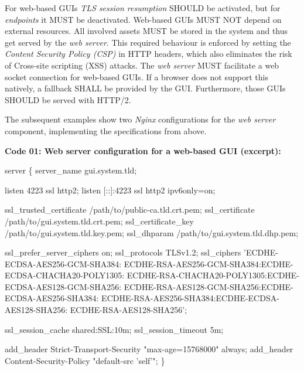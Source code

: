 \documentclass[12pt,english,a4paper,titlepage,cleardoublepage=empty,dottedtoc]{report}
\newenvironment{Shaded}{\begin{snugshade}}{\end{snugshade}}
\newcommand{\NormalTok}[1]{#1}
\begin{document}
For web-based GUIs \emph{TLS session resumption} SHOULD be activated,
but for \emph{endpoints} it MUST be deactivated. Web-based GUIs MUST NOT
depend on external resources. All involved assets MUST be stored in the
system and thus get served by the \emph{web server}. This required
behaviour is enforced by setting the \emph{Content Security Policy
(CSP)} in HTTP headers, which also eliminates the risk of Cross-site
scripting (XSS) attacks. The \emph{web server} MUST facilitate a web
socket connection for web-based GUIs. If a browser does not support this
natively, a fallback SHALL be provided by the GUI. Furthermore, those
GUIs SHOULD be served with HTTP/2.

The subsequent examples show two \emph{Nginx} configurations for the
\emph{web server} component, implementing the specifications from above.

\newpage

\textbf{\protect\hypertarget{spec_code-01_nginx-config-web-gui}{}{Code
01: Web server configuration for a web-based GUI (excerpt)}:}

\begin{Shaded}
\begin{Highlighting}[numbers=left,,]
\NormalTok{server \{}
\NormalTok{    server_name gui.system.tld;}

\NormalTok{    listen 4223 ssl http2;}
\NormalTok{    listen [::]:4223 ssl http2 ipv6only=on;}
    
\NormalTok{    ssl_trusted_certificate /path/to/public-ca.tld.crt.pem;}
\NormalTok{    ssl_certificate         /path/to/gui.system.tld.crt.pem;}
\NormalTok{    ssl_certificate_key     /path/to/gui.system.tld.key.pem;}
\NormalTok{    ssl_dhparam             /path/to/gui.system.tld.dhp.pem;}
    
\NormalTok{    ssl_prefer_server_ciphers on;}
\NormalTok{    ssl_protocols TLSv1.2;}
\NormalTok{    ssl_ciphers 'ECDHE-ECDSA-AES256-GCM-SHA384:}
\NormalTok{        ECDHE-RSA-AES256-GCM-SHA384:ECDHE-ECDSA-CHACHA20-POLY1305:}
\NormalTok{        ECDHE-RSA-CHACHA20-POLY1305:ECDHE-ECDSA-AES128-GCM-SHA256:}
\NormalTok{        ECDHE-RSA-AES128-GCM-SHA256:ECDHE-ECDSA-AES256-SHA384:}
\NormalTok{        ECDHE-RSA-AES256-SHA384:ECDHE-ECDSA-AES128-SHA256:}
\NormalTok{        ECDHE-RSA-AES128-SHA256';}

\NormalTok{    ssl_session_cache shared:SSL:10m;}
\NormalTok{    ssl_session_timeout 5m;}
    
\NormalTok{    add_header Strict-Transport-Security "max-age=15768000" always;}
\NormalTok{    add_header Content-Security-Policy "default-src 'self'";}
\NormalTok{\}}
\end{Highlighting}
\end{Shaded}
\end{document}
